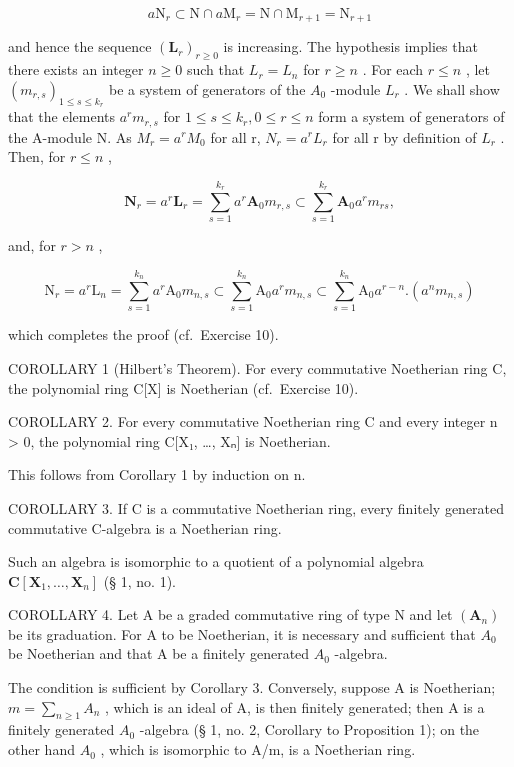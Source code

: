 \[
a \mathrm{N} _ {r} \subset \mathrm{N} \cap a \mathrm{M} _ {r} = \mathrm{N} \cap \mathrm{M} _ {r + 1} = \mathrm{N} _ {r + 1}
\]

and hence the sequence \((\mathbf{L}_{r})_{r\geqslant0}\) is increasing. The hypothesis implies that there exists an integer \(n\geqslant0\) such that \(L_{r}=L_{n}\) for \(r\geqslant n\) . For each \(r\leqslant n\) , let \((m_{r,s})_{1\leqslant s\leqslant k_{r}}\) be a system of generators of the \(A_{0}\) -module \(L_{r}\) . We shall show that the elements \(a^{r}m_{r,s}\) for \(1\leqslant s\leqslant k_{r}, 0\leqslant r\leqslant n\) form a system of generators of the A-module N. As \(M_{r}=a^{r}M_{0}\) for all r, \(N_{r}=a^{r}L_{r}\) for all r by definition of \(L_{r}\) . Then, for \(r\leqslant n\) ,

\[
\mathbf {N} _ {r} = a ^ {r} \mathbf {L} _ {r} = \sum_ {s = 1} ^ {k _ {r}} a ^ {r} \mathbf {A} _ {0} m _ {r, s} \subset \sum_ {s = 1} ^ {k _ {r}} \mathbf {A} _ {0} a ^ {r} m _ {r s},
\]

and, for \(r > n\) ,

\[
\mathrm{N} _ {r} = a ^ {r} \mathrm{L} _ {n} = \sum_ {s = 1} ^ {k _ {n}} a ^ {r} \mathrm{A} _ {0} m _ {n, s} \subset \sum_ {s = 1} ^ {k _ {n}} \mathrm{A} _ {0} a ^ {r} m _ {n, s} \subset \sum_ {s = 1} ^ {k _ {n}} \mathrm{A} _ {0} a ^ {r - n}. (a ^ {n} m _ {n, s})
\]

which completes the proof (cf.~Exercise 10).

COROLLARY 1 (Hilbert's Theorem). For every commutative Noetherian ring C, the polynomial ring C{[}X{]} is Noetherian (cf.~Exercise 10).

COROLLARY 2. For every commutative Noetherian ring C and every integer n \textgreater{} 0, the polynomial ring C{[}X₁, \ldots, Xₙ{]} is Noetherian.

This follows from Corollary 1 by induction on n.

COROLLARY 3. If C is a commutative Noetherian ring, every finitely generated commutative C-algebra is a Noetherian ring.

Such an algebra is isomorphic to a quotient of a polynomial algebra \(\mathbf{C}[\mathbf{X}_1,\ldots ,\mathbf{X}_n]\) (§ 1, no. 1).

COROLLARY 4. Let A be a graded commutative ring of type N and let \((\mathbf{A}_{n})\) be its graduation. For A to be Noetherian, it is necessary and sufficient that \(A_{0}\) be Noetherian and that A be a finitely generated \(A_{0}\) -algebra.

The condition is sufficient by Corollary 3. Conversely, suppose A is Noetherian; \(m = \sum_{n \geqslant 1} A_n\) , which is an ideal of A, is then finitely generated; then A is a finitely generated \(A_0\) -algebra (§ 1, no. 2, Corollary to Proposition 1); on the other hand \(A_0\) , which is isomorphic to A/m, is a Noetherian ring.

